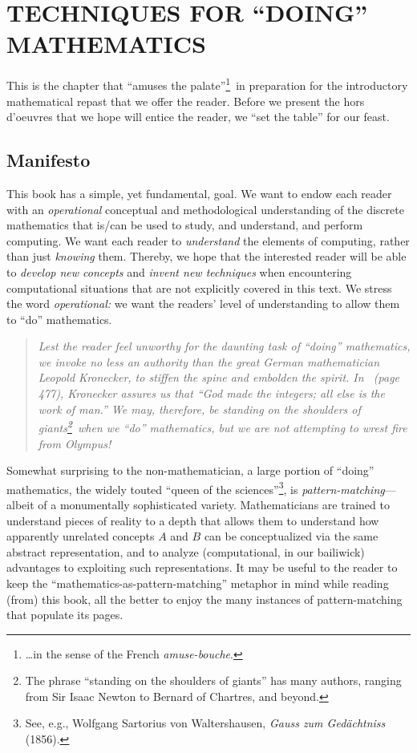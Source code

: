 
\chapter{TECHNIQUES FOR ``DOING'' MATHEMATICS}
\label{ch:doingmath}

This is the chapter that ``amuses the palate''\footnote{\ldots in the
  sense of the French {\em amuse-bouche}.}~in preparation for the
introductory mathematical repast that we offer the reader.  Before we
present the hors d'oeuvres that we hope will entice the reader, we
``set the table'' for our feast.


\section{Manifesto}
\label{sec:manifesto}

This book has a simple, yet fundamental, goal.  We want to endow each
reader with an {\em operational} conceptual and methodological
understanding of the discrete mathematics that is/can be used to
study, and understand, and perform computing.  We want each reader to
{\em understand} the elements of computing, rather than just {\em
  knowing} them.  Thereby, we hope that the interested reader will be
able to {\em develop new concepts} and {\em invent new techniques}
when encountering computational situations that are not explicitly
covered in this text.  We stress the word {\it operational:} we want
the readers' level of understanding to allow them to ``do''
mathematics.
\begin{quote}
{\em Lest the reader feel unworthy for the daunting task of ``doing''
  mathematics, we invoke no less an authority than the great German
  mathematician Leopold Kronecker,  to
  stiffen the spine and embolden the spirit.  In~\cite{Bell86} (page
  477), Kronecker assures us that ``God made the integers; all else is
  the work of man.''  We may, therefore, be standing on the shoulders
  of giants\footnote{The phrase ``standing on the shoulders of
    giants'' has many authors, ranging from Sir Isaac Newton to
    Bernard of Chartres, and beyond.}~when we ``do'' mathematics, but
  we are not attempting to wrest fire from Olympus!}
\end{quote}

Somewhat surprising to the non-mathematician, a large portion of
``doing'' mathematics, the widely touted ``queen of the
sciences''\footnote{See, e.g., Wolfgang Sartorius von Waltershausen,
  {\it Gauss zum Ged\"{a}chtniss} (1856).}, is {\em
  pattern-matching}---albeit of a monumentally sophisticated variety.
Mathematicians are trained to understand pieces of reality to a depth
that allows them to understand how apparently unrelated concepts $A$
and $B$ can be conceptualized via the same abstract representation,
and to analyze (computational, in our bailiwick) advantages to
exploiting such representations.  It may be useful to the reader to
keep the ``mathematics-as-pattern-matching'' metaphor in mind while
reading (from) this book, all the better to enjoy the many instances
of pattern-matching that populate its pages.

